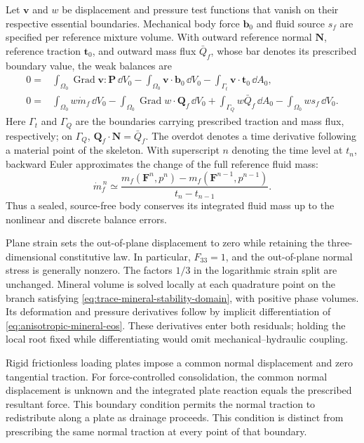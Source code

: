 Let \(\mathbf v\) and \(w\) be displacement and pressure test
functions that vanish on their respective essential boundaries.
Mechanical body force \(\mathbf b_0\) and fluid source \(s_f\) are
specified per reference mixture volume. With outward reference normal
\(\mathbf N\), reference traction \(\mathbf t_0\), and outward mass
flux \(\bar Q_f\), whose bar denotes its prescribed boundary value,
the weak balances are
\begin{align}
 0={}&\int_{\Omega_0}\operatorname{Grad}\mathbf v:\mathbf P\,\dd V_0
      -\int_{\Omega_0}\mathbf v\cdot\mathbf b_0\,\dd V_0
      -\int_{\Gamma_t}\mathbf v\cdot\mathbf t_0\,\dd A_0,
 \label{eq:fe-momentum-residual}\\
 0={}&\int_{\Omega_0}w\dot m_f\,\dd V_0
      -\int_{\Omega_0}\operatorname{Grad}w\cdot\mathbf Q_f\,\dd V_0
      +\int_{\Gamma_Q}w\bar Q_f\,\dd A_0
      -\int_{\Omega_0}w s_f\,\dd V_0.
 \label{eq:fe-fluid-residual}
\end{align}
Here \(\Gamma_t\) and \(\Gamma_Q\) are the boundaries carrying
prescribed traction and mass flux, respectively; on \(\Gamma_Q\),
\(\mathbf Q_f\cdot\mathbf N=\bar Q_f\).
The overdot denotes a time derivative following a material point of the
skeleton. With superscript \(n\) denoting the time level at \(t_n\),
backward Euler approximates the change of the full reference fluid mass:
\begin{equation}
 \dot m_f^{\,n}\simeq
      \frac{m_f(\mathbf F^n,p^n)-m_f(\mathbf F^{n-1},p^{n-1})}
           {t_n-t_{n-1}}.
 \label{eq:fe-conservative-time-step}
\end{equation}
Thus a sealed, source-free body conserves its integrated fluid mass up to
the nonlinear and discrete balance errors.

Plane strain sets the out-of-plane displacement to zero while retaining
the three-dimensional constitutive law. In particular, \(F_{33}=1\),
and the out-of-plane normal stress is generally nonzero. The factors
\(1/3\) in the logarithmic strain split are unchanged. Mineral volume
is solved locally at each quadrature point on the branch satisfying
\eqref{eq:trace-mineral-stability-domain}, with positive phase volumes.
Its deformation and pressure derivatives follow by implicit
differentiation of \eqref{eq:anisotropic-mineral-eos}.
These derivatives enter both residuals; holding the local root fixed
while differentiating would omit mechanical--hydraulic coupling.

Rigid frictionless loading plates impose a common normal displacement
and zero tangential traction. For force-controlled consolidation, the
common normal displacement is unknown and the integrated plate reaction
equals the prescribed resultant force. This boundary condition permits
the normal traction to redistribute along a plate as drainage proceeds.
This condition is distinct from prescribing the same normal traction at
every point of that boundary.


